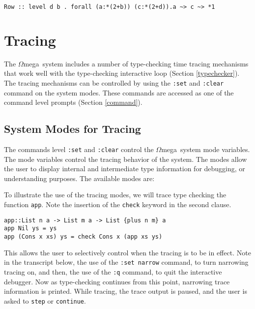 \documentclass[11pt,twoside]{article}
\newcommand{\om}{$\Omega$mega}
\begin{document}
\begin{verbatim}
Row :: level d b . forall (a:*(2+b)) (c:*(2+d)).a ~> c ~> *1
\end{verbatim} 


\section{Tracing}\label{tracing}

The \om\ system includes a number of type-checking time tracing mechanisms that work
well with the type-checking interactive loop (Section \ref{typechecker}). The tracing 
mechanisms can be controlled by using the {\tt :set} and {\tt :clear} command
on the system modes. These commands are accessed as one of the
command level prompts (Section \ref{command}).

\subsection{System Modes for Tracing}
The commands level {\tt :set} and {\tt :clear} control the
\om\ system mode variables.
The mode variables control the tracing behavior of the system. The modes
allow the user to display internal and intermediate type
information for debugging, or understanding purposes.
The available modes are:



To illustrate the use of the tracing modes, we will trace type checking the function
{\tt app}. Note the insertion of the {\tt check} keyword
in the second clause.

\begin{verbatim}
app::List n a -> List m a -> List {plus n m} a   
app Nil ys = ys
app (Cons x xs) ys = check Cons x (app xs ys)
\end{verbatim}

This allows the user to selectively control when the tracing is to be in effect.
Note in the transcript below, the use of the {\tt :set narrow} command, to turn
narrowing tracing on, and then, the use of the {\tt :q} command, to quit the
interactive debugger. Now as type-checking continues from this point, narrowing
trace information is printed. While tracing, the trace output is paused, and the
user is asked to {\tt step} or {\tt continue}.
\end{document}

